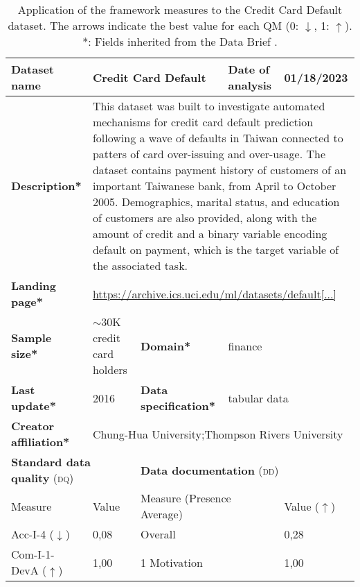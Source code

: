 \begin{table}[h]
    \caption{Application of the framework measures to the Credit Card Default dataset. The arrows indicate the best value for each QM (0: $\downarrow$, 1: $\uparrow$). *: Fields inherited from the Data Brief \cite{fabrisAlgorithmicFairnessDatasets2022}.}
    \label{tab:CreditCardDefault}
    \begin{tabular}{|p{3cm}|p{1.9cm}p{3cm}p{2.6cm}p{1.6cm}|}
        \hline
        \textbf{Dataset name} & \multicolumn{2}{l|}{Credit Card Default} & \multicolumn{1}{l|}{\textbf{Date of analysis}} & 01/18/2023 \\ \hline
        \textbf{Description*} & \multicolumn{4}{p{10cm}|}{This dataset was built to investigate automated mechanisms for credit card default prediction following a wave of defaults in Taiwan connected to patters of card over-issuing and over-usage. The dataset contains payment history of customers of an important Taiwanese bank, from April to October 2005. Demographics, marital status, and education of customers are also provided, along with the amount of credit and a binary variable encoding default on payment, which is the target variable of the associated task.} \\ \hline
        \textbf{Landing page*} & \multicolumn{4}{l|}{\href{https://archive.ics.uci.edu/ml/datasets/default+of+credit+card+clients}{https://archive.ics.uci.edu/ml/datasets/default[...]}} \\ \hline
        \textbf{Sample size*} & $\sim$30K credit card holders & \multicolumn{1}{|l}{\textbf{Domain*}} & \multicolumn{2}{|l|}{finance}  \\ \hline
        \textbf{Last update*} & 2016 & \multicolumn{1}{|p{3cm}}{\textbf{Data specification*}} & \multicolumn{2}{|l|}{tabular data} \\ \hline
        \textbf{Creator affiliation*} & \multicolumn{4}{l|}{Chung-Hua University;Thompson Rivers University} \\ \hline\hline
        \multicolumn{2}{|l|}{\textbf{Standard data quality} (\textsc{dq})} & \multicolumn{3}{|l|}{\textbf{Data documentation} (\textsc{dd})}\\ \hline
        Measure & Value & \multicolumn{2}{|l|}{Measure (Presence Average)} & Value ($\uparrow$) \\ \hline
        Acc-I-4 ($\downarrow$) & 0,08\cellcolor[HTML]{FEF6F3} & \multicolumn{2}{|l|}{Overall} & 0,28\cellcolor[HTML]{FCB099} \\
        Com-I-1-DevA ($\uparrow$) & 1,00\cellcolor[HTML]{FFFFFF} & \multicolumn{2}{|l|}{1 Motivation} & 1,00\cellcolor[HTML]{FFFFFF} \\

\end{tabular}
\end{table}
